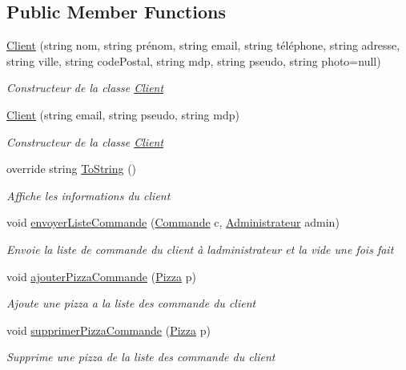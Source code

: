 \subsection*{Public Member Functions}
\begin{DoxyCompactItemize}
\item 
\hyperlink{classModele_1_1Client_a3799aa993898124e3be733ea75b4993b}{Client} (string nom, string prénom, string email, string téléphone, string adresse, string ville, string code\+Postal, string mdp, string pseudo, string photo=null)
\begin{DoxyCompactList}\small\item\em Constructeur de la classe \hyperlink{classModele_1_1Client}{Client} \end{DoxyCompactList}\item 
\hyperlink{classModele_1_1Client_aa2311a3633592b4b5e1910f2be4c632d}{Client} (string email, string pseudo, string mdp)
\begin{DoxyCompactList}\small\item\em Constructeur de la classe \hyperlink{classModele_1_1Client}{Client} \end{DoxyCompactList}\item 
override string \hyperlink{classModele_1_1Client_a2b501ef9cac78e16336bef494ac6a7d8}{To\+String} ()
\begin{DoxyCompactList}\small\item\em Affiche les informations du client \end{DoxyCompactList}\item 
void \hyperlink{classModele_1_1Client_a7c4008e301891dd0d1f9e00f44e7adea}{envoyer\+Liste\+Commande} (\hyperlink{classModele_1_1Commande}{Commande} c, \hyperlink{classModele_1_1Administrateur}{Administrateur} admin)
\begin{DoxyCompactList}\small\item\em Envoie la liste de commande du client à l\textquotesingle{}administrateur et la vide une fois fait \end{DoxyCompactList}\item 
void \hyperlink{classModele_1_1Client_a328e03bcb8a1b69483ae0fa2ee6e188e}{ajouter\+Pizza\+Commande} (\hyperlink{classModele_1_1Pizza}{Pizza} p)
\begin{DoxyCompactList}\small\item\em Ajoute une pizza a la liste des commande du client \end{DoxyCompactList}\item 
void \hyperlink{classModele_1_1Client_ab99de8213e703e5742b1f2c7505fd1ea}{supprimer\+Pizza\+Commande} (\hyperlink{classModele_1_1Pizza}{Pizza} p)
\begin{DoxyCompactList}\small\item\em Supprime une pizza de la liste des commande du client \end{DoxyCompactList}\end{DoxyCompactItemize}
